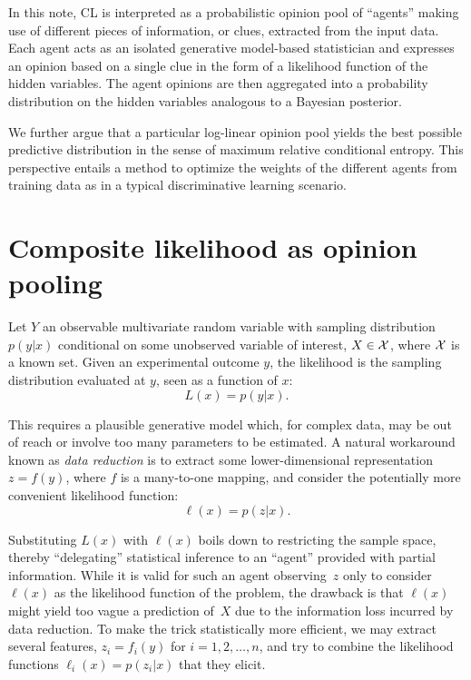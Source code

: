 \documentclass[english]{scrartcl}
\begin{document}
In this note, CL is interpreted as a probabilistic opinion pool of ``agents'' making use of different pieces of information, or clues, extracted from the input data. Each agent acts as an isolated generative model-based statistician and expresses an opinion based on a single clue in the form of a likelihood function of the hidden variables. The agent opinions are then aggregated into a probability distribution on the hidden variables analogous to a Bayesian posterior.

We further argue that a particular log-linear opinion pool yields the best possible predictive distribution in the sense of maximum relative conditional entropy. This perspective entails a method to optimize the weights of the different agents from training data as in a typical discriminative learning scenario. 



\section{Composite likelihood as opinion pooling}
\label{sec:pool}

Let $Y$ an observable multivariate random variable with sampling distribution $p(y|x)$ conditional on some unobserved variable of interest, $X\in{\cal X}$, where ${\cal X}$ is a known set. Given an experimental outcome $y$, the likelihood is the sampling distribution evaluated at $y$, seen as a function of $x$:
$$
L(x) = p(y|x)
.
$$

This requires a plausible generative model which, for complex data, may be out of reach or involve too many parameters to be estimated. A natural workaround known as {\em data reduction} is to extract some lower-dimensional representation $z=f(y)$, where $f$ is a many-to-one mapping, and consider the potentially more convenient likelihood function:
$$
\ell(x) = p(z|x)
.
$$

Substituting $L(x)$ with $\ell(x)$ boils down to restricting the sample space, thereby  ``delegating'' statistical inference to an ``agent'' provided with partial information. While it is valid for such an agent observing~$z$ only to consider $\ell(x)$ as the likelihood function of the problem, the drawback is that $\ell(x)$ might yield too vague a prediction of~$X$ due to the information loss incurred by data reduction. To make the trick statistically more efficient, we may extract several features, $z_i=f_i(y)$ for $i=1,2,\ldots,n$, and try to combine the likelihood functions $\ell_i(x) = p(z_i|x)$ that they elicit.
\end{document}
